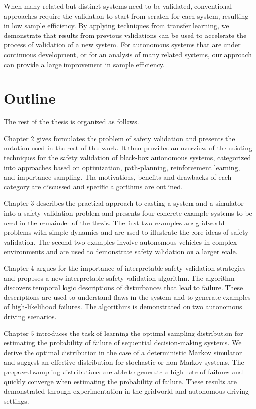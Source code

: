 When many related but distinct systems need to be validated, conventional approaches require the validation to start from scratch for each system, resulting in low sample efficiency. By applying techniques from transfer learning, we demonstrate that results from previous validations can be used to accelerate the process of validation of a new system. For autonomous systems that are under continuous development, or for an analysis of many related systems, our approach can provide a large improvement in sample efficiency.


\section{Outline}
The rest of the thesis is organized as follows. 

Chapter 2 gives formulates the problem of safety validation and presents the notation used in the rest of this work. It then provides an overview of the existing techniques for the safety validation of black-box autonomous systems, categorized into approaches based on optimization, path-planning, reinforcement learning, and importance sampling. The motivations, benefits and drawbacks of each category are discussed and specific algorithms are outlined. 

Chapter 3 describes the practical approach to casting a system and a simulator into a safety validation problem and presents four concrete example systems to be used in the remainder of the thesis. The first two examples are gridworld problems with simple dynamics and are used to illustrate the core ideas of safety validation. The second two examples involve autonomous vehicles in complex environments and are used to demonstrate safety validation on a larger scale. 

Chapter 4 argues for the importance of interpretable safety validation strategies and proposes a new interpretable safety validation algorithm. The algorithm discovers temporal logic descriptions of disturbances that lead to failure. These descriptions are used to understand flaws in the system and to generate examples of high-likelihood failures. The algorithms is demonstrated on two autonomous driving scenarios. 

Chapter 5 introduces the task of learning the optimal sampling distribution for estimating the probability of failure of sequential decision-making systems. We derive the optimal distribution in the case of a deterministic Markov simulator and suggest an effective distribution for stochastic or non-Markov systems. The proposed sampling distributions are able to generate a high rate of failures and quickly converge when estimating the probability of failure. These results are demonstrated through experimentation in the gridworld and autonomous driving settings.


